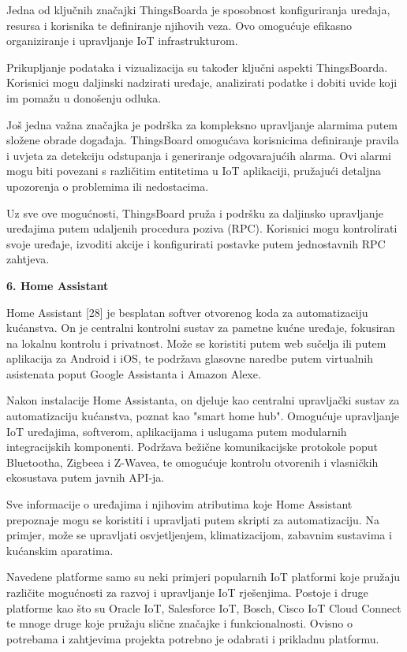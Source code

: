 \documentclass[times, utf8, zavrsni]{fer}
\begin{document}
Jedna od ključnih značajki ThingsBoarda je sposobnost konfiguriranja uređaja, resursa i korisnika te definiranje njihovih veza. Ovo omogućuje efikasno organiziranje i upravljanje IoT infrastrukturom.

Prikupljanje podataka i vizualizacija su također ključni aspekti ThingsBoarda. Korisnici mogu daljinski nadzirati uređaje, analizirati podatke i dobiti uvide koji im pomažu u donošenju odluka.

Još jedna važna značajka je podrška za kompleksno upravljanje alarmima putem složene obrade događaja. ThingsBoard omogućava korisnicima definiranje pravila i uvjeta za detekciju odstupanja i generiranje odgovarajućih alarma. Ovi alarmi mogu biti povezani s različitim entitetima u IoT aplikaciji, pružajući detaljna upozorenja o problemima ili nedostacima.

Uz sve ove mogućnosti, ThingsBoard pruža i podršku za daljinsko upravljanje uređajima putem udaljenih procedura poziva (RPC). Korisnici mogu kontrolirati svoje uređaje, izvoditi akcije i konfigurirati postavke putem jednostavnih RPC zahtjeva.

\textbf{6. Home Assistant}

Home Assistant [28] je besplatan softver otvorenog koda za automatizaciju kućanstva. On je centralni kontrolni sustav za pametne kućne uređaje, fokusiran na lokalnu kontrolu i privatnost. Može se koristiti putem web sučelja ili putem aplikacija za Android i iOS, te podržava glasovne naredbe putem virtualnih asistenata poput Google Assistanta i Amazon Alexe.

Nakon instalacije Home Assistanta, on djeluje kao centralni upravljački sustav za automatizaciju kućanstva, poznat kao "smart home hub". Omogućuje upravljanje IoT uređajima, softverom, aplikacijama i uslugama putem modularnih integracijskih komponenti. Podržava bežične komunikacijske protokole poput Bluetootha, Zigbeea i Z-Wavea, te omogućuje kontrolu otvorenih i vlasničkih ekosustava putem javnih API-ja.

Sve informacije o uređajima i njihovim atributima koje Home Assistant prepoznaje mogu se koristiti i upravljati putem skripti za automatizaciju. Na primjer, može se upravljati osvjetljenjem, klimatizacijom, zabavnim sustavima i kućanskim aparatima.


\vspace{\baselineskip}

Navedene platforme samo su neki primjeri popularnih IoT platformi koje pružaju različite mogućnosti za razvoj i upravljanje IoT rješenjima. Postoje i druge platforme kao što su  Oracle IoT, Salesforce IoT, Bosch, Cisco IoT Cloud Connect te mnoge druge koje pružaju slične značajke i funkcionalnosti. Ovisno o potrebama i zahtjevima projekta potrebno je odabrati i prikladnu platformu.
\end{document}
